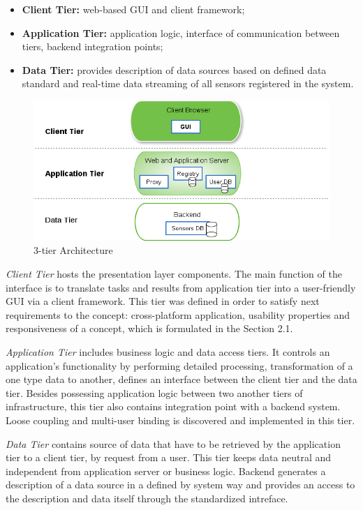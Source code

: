   \begin{itemize}
  \item \textbf{Client Tier:} web-based GUI and client framework;
  \item \textbf{Application Tier:} application logic, interface of communication between tiers, backend integration points;
  \item \textbf{Data Tier:} provides description of data sources based on defined data standard and real-time data streaming of all sensors registered in the system.
  \end{itemize} 

  \begin{figure}[!ht]
  \centering
  \includegraphics[scale=0.7]{images/3tier.png}   
  \caption[3-tier Architecture]{3-tier Architecture}
  \label{img:3-tier Architecture}                           
  \end{figure}

  \emph{Client Tier} hosts the presentation layer components. The main function of the interface is to translate tasks and results from application tier into a user-friendly GUI via a client framework. This tier was defined in order to satisfy next requirements to the concept: cross-platform application, usability properties and responsiveness of a concept, which is formulated in the Section 2.1.

  \emph{Application Tier} includes business logic and data access tiers. It controls an application's functionality by performing detailed processing, transformation of a one type data to another, defines an interface between the client tier and the data tier. Besides possessing application logic between two another tiers of infrastructure, this tier also contains integration point with a backend system. Loose coupling and multi-user binding is discovered and implemented in this tier.

  \emph{Data Tier} contains source of data that have to be retrieved by the application tier to a client tier, by request from a user. This tier keeps data neutral and independent from application server or business logic. Backend generates a description of a data source in a defined by system way and provides an access to the description and data itself through the standardized intreface.

